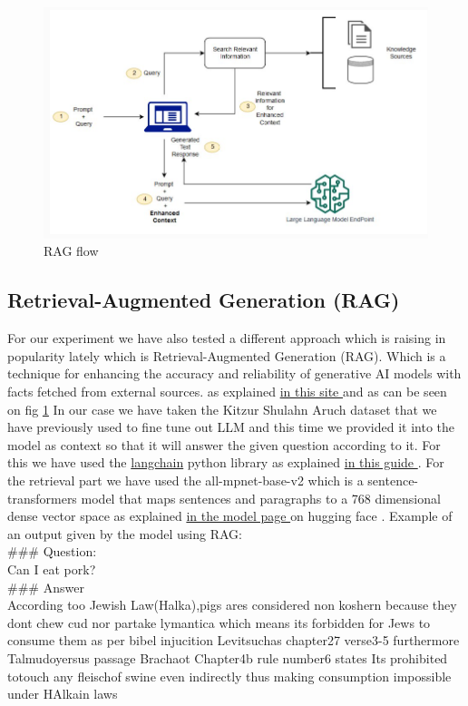 \documentclass[11pt]{article}
\begin{document}
\begin{figure}
    \centering
    \includegraphics[width=1\linewidth]{RAG_flow.png}
    \caption{RAG flow}
    \label{fig:RAG_flow}
\end{figure}
   

\subsection{Retrieval-Augmented Generation (RAG)}
For our experiment we have also tested a different approach which is raising in popularity lately which is Retrieval-Augmented Generation (RAG). Which is a technique for enhancing the accuracy and reliability of generative AI models with facts fetched from external sources. as explained \href{https://www.databricks.com/glossary/retrieval-augmented-generation-rag#:~:text=An%20easy%20and%20popular%20way,augmented%20context%20for%20the%20LLM. }{in this site } and as can be seen on fig \ref{fig:RAG_flow} 
In our case we have taken the Kitzur Shulahn Aruch dataset that we have previously used to fine tune out LLM and this time we provided it into the model as context so that it will answer the given question according to it.  
For this we have used the \href{https://python.langchain.com/v0.1/docs/get_started/introduction/}{langchain} python library as explained \href{https://www.kaggle.com/code/gpreda/rag-using-llama-2-langchain-and-chromadb/notebook#Retrieval-Augmented-Generation }{in this guide }.
For the retrieval part we have used the all-mpnet-base-v2 which is a sentence-transformers model that maps sentences and paragraphs to a 768 dimensional dense vector space as explained  \href{https://huggingface.co/sentence-transformers/all-mpnet-base-v2 }{in the model page } on hugging face .
Example of an output given by the model using RAG:\\
\#\#\# Question: \\
    Can I eat pork?\\
\#\#\# Answer \\
According  too Jewish Law(Halka),pigs
ares considered non koshern because
they dont chew cud nor partake 
lymantica which means its forbidden
for Jews to consume them as per bibel
injucition Levitsuchas chapter27
verse3-5 furthermore Talmudoyersus
passage Brachaot Chapter4b rule number6
states Its prohibited totouch any fleischof
swine even indirectly thus making 
consumption impossible under HAlkain laws
\end{document}
